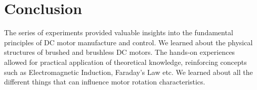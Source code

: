 \documentclass[12pt,a4paper]{report}
\begin{document}
\section{Conclusion}
The series of experiments provided valuable insights into the fundamental
principles of DC motor manufacture and control. 
We learned about the physical structures of brushed and brushless DC motors. 
The hands-on experiences allowed for practical application of theoretical knowledge, reinforcing
concepts such as Electromagnetic Induction, Faraday's Law etc. 
We learned about all the different things that can influence motor rotation characteristics. 

\listoffigures
\listoftables
\end{document}
